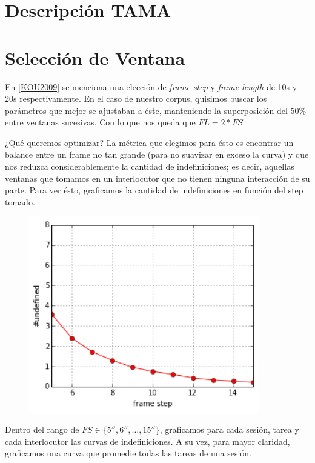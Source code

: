 \section{Descripción TAMA}

\section{Selección de Ventana}

En \ref{KOU2009} se menciona una elección de \emph{frame step} y \emph{frame length} de 10s y 20s respectivamente. En el caso de nuestro corpus, quisimos buscar los parámetros que mejor se ajustaban a éste, manteniendo la superposición del 50\% entre ventanas sucesivas. Con lo que nos queda que $FL = 2 * FS$

¿Qué queremos optimizar? La métrica que elegimos para ésto es encontrar un balance entre un frame no tan grande (para no suavizar en exceso la curva) y que nos reduzca considerablemente la cantidad de indefiniciones; es decir, aquellas ventanas que tomamos en un interlocutor que no tienen ninguna interacción de su parte. Para ver ésto, graficamos la cantidad de indefiniciones en función del step tomado.

\begin{figure}
\centering
\includegraphics[width=10cm]{images/window_selection.png}
\end{figure}



Dentro del rango de $FS \in \{5'',6'', \ldots ,15'' \}$, graficamos para cada sesión, tarea y cada interlocutor las curvas de indefiniciones. A su vez, para mayor claridad, graficamos una curva que promedie todas las tareas de una sesión.


